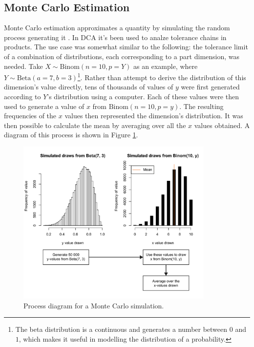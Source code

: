 \documentclass[11pt,a4paper,article]{memoir} %
\begin{document}
\newpage
\subsection*{Monte Carlo Estimation}
Monte Carlo estimation approximates a quantity by simulating the random process generating it . In DCA it's been used to analze tolerance chains in products. The use case was somewhat similar to the following: the tolerance limit of a combination of distributions, each corresponding to a part dimension, was needed. Take $X \sim \text{Binom}(n = 10, p = Y)$ as an example, where $Y \sim \text{Beta}(a = 7, b = 3)$\footnote{The beta distribution is a continuous and generates a number between $0$ and $1$, which makes it useful in modelling the distribution of a probability.}. Rather than attempt to derive the distribution of this dimension's value directly, tens of thousands of values of $y$ were first generated according to $Y$'s distribution using a computer. Each of these values were then used to generate a value of $x$ from $\text{Binom}(n = 10, p = y)$. The resulting frequencies of the $x$ values then represented the dimension's distribution. It was then possible to calculate the mean by averaging over all the $x$ values obtained. A diagram of this process is shown in Figure \ref{fig:monte_carlo}.
\begin{figure}[b!]
\includegraphics[width=0.87\textwidth]{monte_carlo_simulation.pdf}
\caption{Process diagram for a Monte Carlo simulation.}
\label{fig:monte_carlo}
\end{figure}


\newpage
\end{document}
